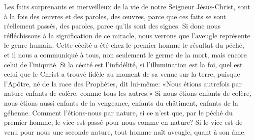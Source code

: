 Les faits surprenants et merveilleux de la vie de notre Seigneur Jésus-Christ,
	sont à la fois des œuvres et des paroles,
	des œuvres, parce que ces faits se sont réellement passés,
	des paroles, parce qu’ils sont des signes.
Si donc nous réfléchissons à la signification de ce miracle,
	nous verrons que l’aveugle représente le genre humain.
Cette cécité a été chez le premier homme le résultat du péché,
	et il nous a communiqué à tous, non seulement le germe de la mort,
	mais encore celui de l’iniquité.
Si la cécité est l’infidélité, si l’illumination est la foi,
	quel est celui que le Christ a trouvé fidèle
		au moment de sa venue sur la terre,
	puisque l’Apôtre, né de la race des Prophètes, dit lui-même:
	«Nous étions autrefois par nature enfants de colère, comme tous les autres.»
Si nous étions enfants de colère,
	nous étions aussi enfants de la vengeance,
	enfants du châtiment, enfants de la géhenne.
Comment l’étions-nous par nature,
	si ce n’est que, par le péché du premier homme,
	le vice est passé pour nous comme en nature?
Si le vice est de venu pour nous une seconde nature,
	tout homme naît aveugle, quant à son âme.

